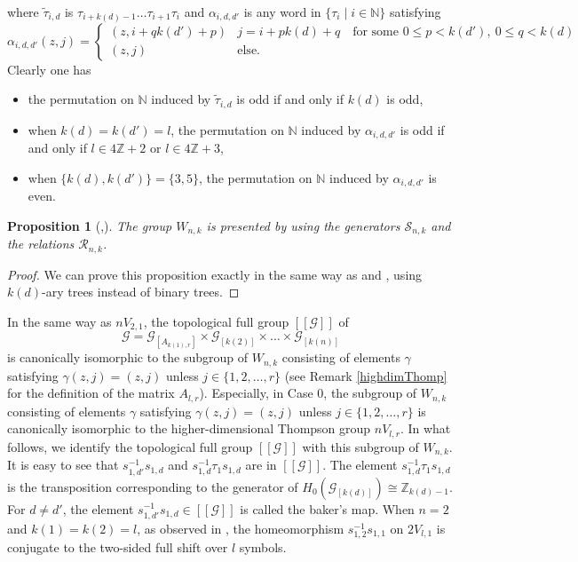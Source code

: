 \documentclass[11pt]{article}
\newtheorem{proposition}[theorem]{Proposition}
\theoremstyle{definition}
\numberwithin{equation}{section}
\newcommand{\G}{\mathcal{G}}
\newcommand{\N}{\mathbb{N}}
\newcommand{\Z}{\mathbb{Z}}
\begin{document}
where $\tilde\tau_{i,d}$ is $\tau_{i+k(d)-1}\dots\tau_{i+1}\tau_i$ and 
$\alpha_{i,d,d'}$ is any word in $\{\tau_i\mid i\in\N\}$ satisfying 
\[
\alpha_{i,d,d'}(z,j)=\begin{cases}(z,i{+}qk(d'){+}p)&j=i{+}pk(d){+}q\quad
\text{for some }0{\leq}p{<}k(d'),\ 0{\leq}q{<}k(d)\\
(z,j)&\text{else. }\end{cases}
\]
Clearly one has 
\begin{itemize}
\item the permutation on $\N$ induced by $\tilde\tau_{i,d}$ is odd 
if and only if $k(d)$ is odd, 
\item when $k(d)=k(d')=l$, 
the permutation on $\N$ induced by $\alpha_{i,d,d'}$ is odd 
if and only if $l\in4\Z+2$ or $l\in4\Z+3$, 
\item when $\{k(d),k(d')\}=\{3,5\}$, 
the permutation on $\N$ induced by $\alpha_{i,d,d'}$ is even. 
\end{itemize}

\begin{proposition}
[{\cite[Theorem 2]{Brin05JAlg}},{\cite[Theorem 1.1]{HM12PJM}}]
The group $W_{n,k}$ is presented 
by using the generators $\mathcal{S}_{n,k}$ and 
the relations $\mathcal{R}_{n,k}$. 
\end{proposition}
\begin{proof}
We can prove this proposition exactly in the same way 
as \cite{Brin05JAlg} and \cite{HM12PJM}, 
using $k(d)$-ary trees instead of binary trees. 
\end{proof}

In the same way as $nV_{2,1}$, 
the topological full group $[[\G]]$ of 
\[
\G=\G_{[A_{k(1),r}]}\times\G_{[k(2)]}\times\dots\times\G_{[k(n)]}
\]
is canonically isomorphic to the subgroup of $W_{n,k}$ 
consisting of elements $\gamma$ 
satisfying $\gamma(z,j)=(z,j)$ unless $j\in\{1,2,\dots,r\}$ 
(see Remark \ref{highdimThomp} for the definition of the matrix $A_{l,r}$). 
Especially, in Case 0, 
the subgroup of $W_{n,k}$ consisting of elements $\gamma$ 
satisfying $\gamma(z,j)=(z,j)$ unless $j\in\{1,2,\dots,r\}$ is 
canonically isomorphic to the higher-dimensional Thompson group $nV_{l,r}$. 
In what follows, 
we identify the topological full group $[[\G]]$ 
with this subgroup of $W_{n,k}$. 
It is easy to see that 
$s_{1,d'}^{-1}s_{1,d}$ and $s_{1,d}^{-1}\tau_1s_{1,d}$ are in $[[\G]]$. 
The element $s_{1,d}^{-1}\tau_1s_{1,d}$ is the transposition 
corresponding to the generator of $H_0(\G_{[k(d)]})\cong\Z_{k(d)-1}$. 
For $d\neq d'$, 
the element $s_{1,d'}^{-1}s_{1,d}\in[[\G]]$ is called the baker's map. 
When $n=2$ and $k(1)=k(2)=l$, 
as observed in \cite[Lemma 8.1]{Brin04GeomD}, 
the homeomorphism $s_{1,2}^{-1}s_{1,1}$ on $2V_{l,1}$ is 
conjugate to the two-sided full shift over $l$ symbols. 
\end{document}
